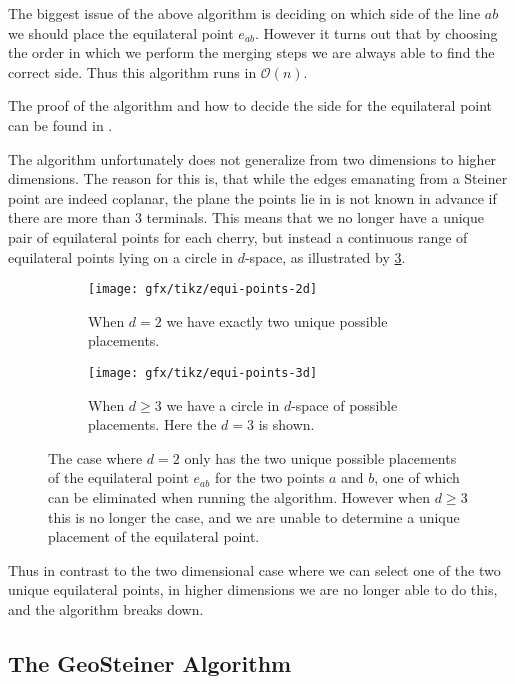 The biggest issue of the above algorithm is deciding on which side of the line
$ab$ we should place the equilateral point $e_{ab}$. However it turns out that
by choosing the order in which we perform the merging steps we are always able
to find the correct side. Thus this algorithm runs in $\mathcal{O}(n)$.

The proof of the algorithm and how to decide the side for the equilateral point
can be found in \textcite[ch.~1]{brazil2015}.

The algorithm unfortunately does not generalize from two dimensions to higher
dimensions. The reason for this is, that while the edges emanating from a
Steiner point are indeed coplanar, the plane the points lie in is not known in
advance if there are more than $3$ terminals. This means that we no longer
have a unique pair of equilateral points for each cherry, but instead a
continuous range of equilateral points lying on a circle in
$d$-space, as illustrated by \cref{fig:equi-points}.
%
\begin{figure}[htbp]
  \centering
  \begin{subfigure}[t]{0.4\textwidth}
    \texttt{[image: gfx/tikz/equi-points-2d]}
    \caption{When $d = 2$ we have exactly two unique possible
      placements.\label{fig:equi-points-2d}}
  \end{subfigure}\hspace{1em}%
  \begin{subfigure}[t]{0.4\textwidth}
    \texttt{[image: gfx/tikz/equi-points-3d]}
    \caption{When $d \ge 3$ we have a circle in $d$-space of possible
      placements. Here the $d = 3$ is shown.\label{fig:equi-points-3d}}
  \end{subfigure}
  \caption[Equilateral points in 2D and $d$-space]{The case where $d = 2$ only
    has the two unique possible placements of the equilateral point $e_{ab}$ for the
    two points $a$ and $b$, one of which can be eliminated when running the
    algorithm. However when $d \ge 3$ this is no longer the case, and we are
    unable to determine a unique placement of the equilateral
    point.\label{fig:equi-points}}
\end{figure}
%
Thus in contrast to the two dimensional case where we can select one of the two
unique equilateral points, in higher dimensions we are no longer able to do
this, and the algorithm breaks down.

\subsection{The GeoSteiner Algorithm}
\label{sec:geosteiner-algorithm}

